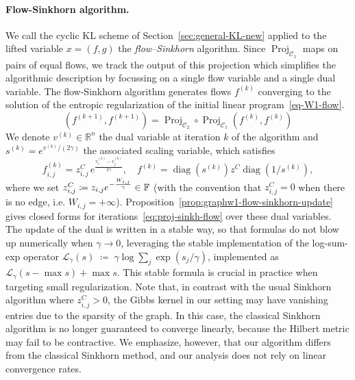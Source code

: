 \documentclass{article}
\theoremstyle{plain}
\newcommand{\length}{W}
\newcommand{\eqdef}{\coloneqq}
\newcommand{\RR}{\mathbb{R}}
\newcommand{\Ll}{\mathcal{L}}
\newcommand{\Cc}{\mathcal{C}}
\DeclareMathOperator{\Proj}{Proj}
\DeclareMathOperator{\diag}{diag}
\newcommand{\z}{z}
\newcommand{\zC}{\z^C}
\begin{document}
\paragraph{Flow-Sinkhorn algorithm.}

We call the cyclic KL scheme of Section~\ref{sec:general-KL-new} applied to the lifted variable $x=(f,g)$ the \textit{flow--Sinkhorn} algorithm. 
%
Since $\Proj_{\Cc_{1}}$ maps on pairs of equal flows, we track the output of this projection which simplifies the algorithmic description by focussing on a single flow variable and a single dual variable.
%
The flow-Sinkhorn algorithm generates flows $f^{(k)}$ converging to the solution of the entropic regularization of the initial linear program~\eqref{eq-W1-flow}.
\begin{equation}\label{eq:proj-sinkh-flow}
	(f^{(k+1)}, f^{(k+1)}) = \Proj_{\Cc_{2}} \circ \Proj_{\Cc_{1}}( f^{(k)}, f^{(k)} )
\end{equation}
%
We denote $v^{(k)} \in \RR^{n}$ the dual variable at iteration $k$ of the algorithm and $s^{(k)} = e^{v^{(k)}/(2\gamma)}$ the associated scaling variable, which satisfies
\begin{equation}
\label{eq:bregman-flow-form}
	f^{(k)}_{i,j} = \zC_{i,j} \, e^{\frac{v_i^{(k)}-v_j^{(k)}}{2\gamma}}, \quad
	f^{(k)} = \diag(s^{(k)}) \zC \diag(1/s^{(k)}), 
\end{equation}
where we set $\zC_{i,j} \eqdef \z_{i,j} e^{-\frac{\length_{i,j}}{\gamma}} \in \Flows$ (with the convention that $\zC_{i,j} = 0$ when there is no edge, i.e. $\length_{i,j}=+\infty$).
%
Proposition~\ref{prop:graphw1-flow-sinkhorn-update} gives closed forms for iterations~\eqref{eq:proj-sinkh-flow} over these dual variables.
%
The update of the dual is written in a stable way, so that formulas do not blow up numerically when $\gamma \to 0$, leveraging the stable implementation of the log-sum-exp operator
$
	\Ll_{\gamma}(s)\;\eqdef\;\gamma\log\!\sum_{j}\exp(s_{j}/\gamma)
$, implemented as $\Ll_{\gamma}(s-\max s)+\max s$.
This stable formula is crucial in practice when targeting small regularization.
%
Note that, in contrast with the usual Sinkhorn algorithm where $\zC_{i,j}>0$,  the Gibbs kernel in our setting may have vanishing entries due to the sparsity of the graph.  In this case, the classical Sinkhorn algorithm is no longer guaranteed to converge linearly,  because the Hilbert metric may fail to be contractive.  We emphasize, however, that our algorithm differs from the classical Sinkhorn method,  and our analysis does not rely on linear convergence rates. 
\end{document}
